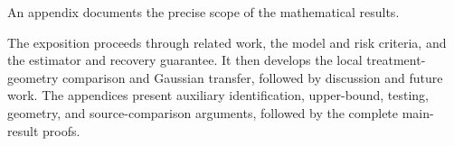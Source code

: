 An appendix documents the precise scope of the mathematical results.

The exposition proceeds through related work, the model and risk criteria, and the estimator and recovery guarantee. It then develops the local treatment-geometry comparison and Gaussian transfer, followed by discussion and future work. The appendices present auxiliary identification, upper-bound, testing, geometry, and source-comparison arguments, followed by the complete main-result proofs.
